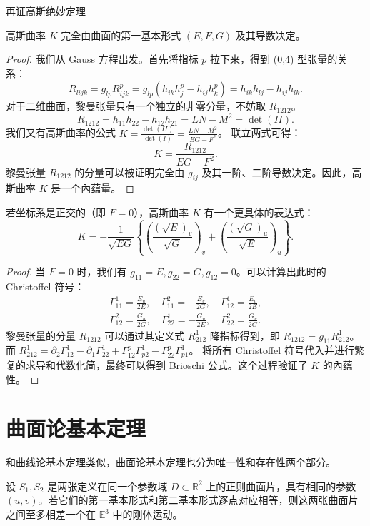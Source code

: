 \documentclass[lang=cn,10pt,thmcnt=section]{elegantbook}
\begin{document}
再证高斯绝妙定理
\begin{theorem}[高斯绝妙定理]
高斯曲率 $K$ 完全由曲面的第一基本形式 $(E,F,G)$ 及其导数决定。
\end{theorem}
\begin{proof}
    我们从 Gauss 方程出发。首先将指标 $p$ 拉下来，得到 (0,4) 型张量的关系：
    \[
    R_{lijk} = g_{lp} R_{ijk}^p = g_{lp}(h_{ik} h_j^p - h_{ij} h_k^p) = h_{ik}h_{lj} - h_{ij}h_{lk}.
    \]
    对于二维曲面，黎曼张量只有一个独立的非零分量，不妨取 $R_{1212}$。
    \[
    R_{1212} = h_{11}h_{22} - h_{12}h_{21} = LN - M^2 = \det(II).
    \]
    我们又有高斯曲率的公式 $K = \frac{\det(II)}{\det(I)} = \frac{LN-M^2}{EG-F^2}$。
    联立两式可得：
    \[
    K = \frac{R_{1212}}{EG-F^2}.
    \]
    黎曼张量 $R_{1212}$ 的分量可以被证明完全由 $g_{ij}$ 及其一阶、二阶导数决定。因此，高斯曲率 $K$ 是一个內蕴量。
\end{proof}
\begin{proposition}[Brioschi 公式]
    若坐标系是正交的（即 $F=0$），高斯曲率 $K$ 有一个更具体的表达式：
    \[
    K = -\frac{1}{\sqrt{EG}}\left\{ \left(\frac{(\sqrt{E})_v}{\sqrt{G}}\right)_v + \left(\frac{(\sqrt{G})_u}{\sqrt{E}}\right)_u \right\}.
    \]
\end{proposition}
\begin{proof}
    当 $F=0$ 时，我们有 $g_{11}=E, g_{22}=G, g_{12}=0$。可以计算出此时的 Christoffel 符号：
    \begin{gather*}
        \Gamma_{11}^1 = \frac{E_u}{2E}, \quad \Gamma_{11}^2 = -\frac{E_v}{2G}, \quad \Gamma_{12}^1 = \frac{E_v}{2E}, \\
        \Gamma_{12}^2 = \frac{G_u}{2G}, \quad \Gamma_{22}^1 = -\frac{G_u}{2E}, \quad \Gamma_{22}^2 = \frac{G_v}{2G}.
    \end{gather*}
    黎曼张量的分量 $R_{1212}$ 可以通过其定义式 $R_{212}^1$ 降指标得到，即 $R_{1212}=g_{11}R_{212}^1$。
    而 $R_{212}^1 = \partial_2 \Gamma_{12}^1 - \partial_1 \Gamma_{22}^1 + \Gamma_{12}^p\Gamma_{p2}^1 - \Gamma_{22}^p\Gamma_{p1}^1$。
    将所有 Christoffel 符号代入并进行繁复的求导和代数化简，最终可以得到 Brioschi 公式。这个过程验证了 $K$ 的內蕴性。
\end{proof}



\section{曲面论基本定理}
和曲线论基本定理类似，曲面论基本定理也分为唯一性和存在性两个部分。

\begin{theorem}[唯一性定理]
    设 $S_1, S_2$ 是两张定义在同一个参数域 $D \subset \mathbb{R}^2$ 上的正则曲面片，具有相同的参数 $(u,v)$。若它们的第一基本形式和第二基本形式逐点对应相等，则这两张曲面片之间至多相差一个在 $\mathbb{E}^3$ 中的刚体运动。
\end{theorem}
\end{document}
